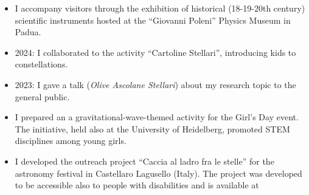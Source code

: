 %
%
%


\begin{experiences}
    
     {}{
     \begin{itemize}
         \item I accompany visitors through the exhibition of historical (18-19-20th century) scientific instruments hosted at the ``Giovanni Poleni'' Physics Museum in Padua.
     \end{itemize}}
    \emptySeparator
     {}{
     \begin{itemize}
         \item 2024: I collaborated to the activity ``Cartoline Stellari'', introducing kids to constellations.
         \item 2023: I gave a talk (\emph{Olive Ascolane Stellari}) about my research topic to the general public.
     \end{itemize}}
     \emptySeparator
     {}{
     \begin{itemize}
         \item I prepared an a gravitational-wave-themed activity for the Girl's Day event. The initiative, held also at the University of Heidelberg, promoted STEM disciplines among young girls.
     \end{itemize}}
    \emptySeparator
     {}{
     \begin{itemize}
         \item I developed the outreach project ``Caccia al ladro fra le stelle'' for the astronomy festival in Castellaro Lagusello (Italy). The project was developed to be accessible also to people with disabilities and is available at 

\end{itemize}}
\end{experiences}
